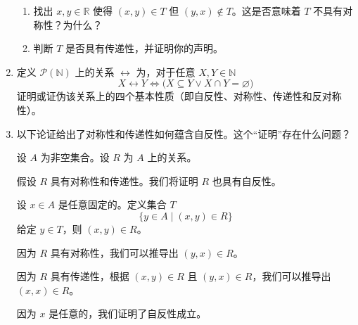 \begin{enumerate}[label=(\arabic*)]
\begin{enumerate}[label=(\alph*)]
        \item 找出 $x,y \in \mathbb{R}$ 使得 $(x,y) \in T$ 但 $(y,x) \notin T$。这是否意味着 $T$ 不具有对称性？为什么？
        \item 判断 $T$ 是否具有传递性，并证明你的声明。
    \end{enumerate}
    \item 定义 $\mathcal{P}(\mathbb{N})$ 上的关系 $\leftrightarrow$ 为，对于任意 $X, Y \in \mathbb{N}$
    \[X \leftrightarrow Y \iff \Big(X \subseteq Y \lor X \cap Y = \varnothing \Big)\]
    证明或证伪该关系上的四个基本性质（即自反性、对称性、传递性和反对称性）。
    \item 以下论证给出了对称性和传递性如何蕴含自反性。这个``证明''存在什么问题？
    \begin{center}
        \noindent
            \parbox{0.85\textwidth}{%
                \linespread{1.5}\selectfont
                设 $A$ 为非空集合。设 $R$ 为 $A$ 上的关系。

                假设 $R$ 具有对称性和传递性。我们将证明 $R$ 也具有自反性。

                设 $x \in A$ 是任意固定的。定义集合 $T$
                \[\{y \in A \mid (x, y) \in R\}\]
                给定 $y \in T$，则 $(x, y) \in R$。

                因为 $R$ 具有对称性，我们可以推导出 $(y,x) \in R$。

                因为 $R$ 具有传递性，根据 $(x, y) \in R$ 且 $(y, x) \in R$，我们可以推导出 $(x,x) \in R$。

                因为 $x$ 是任意的，我们证明了自反性成立。 
            }
    \end{center}
\end{enumerate}